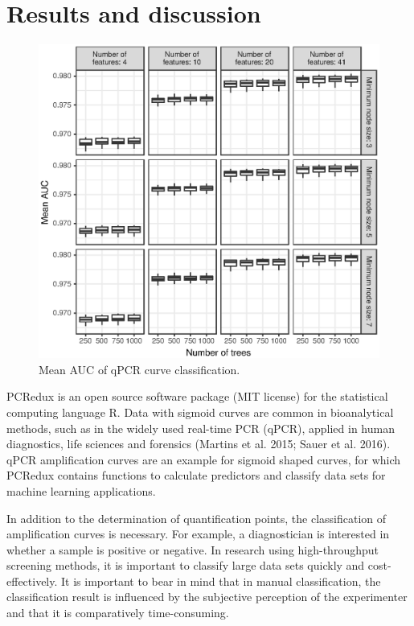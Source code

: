 \documentclass{bioinfo}
\begin{document}
\section{Results and discussion}

\begin{figure}
\centerline{\includegraphics{figures/AUC.eps}}
\caption{Mean AUC of qPCR curve classification.}\label{fig:AUC}
\end{figure}

PCRedux is an open source software package (MIT license) for the statistical computing language
R. Data with sigmoid curves are common in bioanalytical methods, such as in the widely used
real-time PCR (qPCR), applied in human diagnostics, life sciences and forensics (Martins et al.
2015; Sauer et al. 2016). qPCR amplification curves are an example for sigmoid shaped curves,
for which PCRedux contains functions to calculate predictors and classify data sets for machine
learning applications.

In addition to the determination of quantification points, the classification of amplification curves
is necessary. For example, a diagnostician is interested in whether a sample is positive or negative.
In research using high-throughput screening methods, it is important to classify large data sets
quickly and cost-effectively. It is important to bear in mind that in manual classification, the
classification result is influenced by the subjective perception of the experimenter and that it is
comparatively time-consuming.
\end{document}
